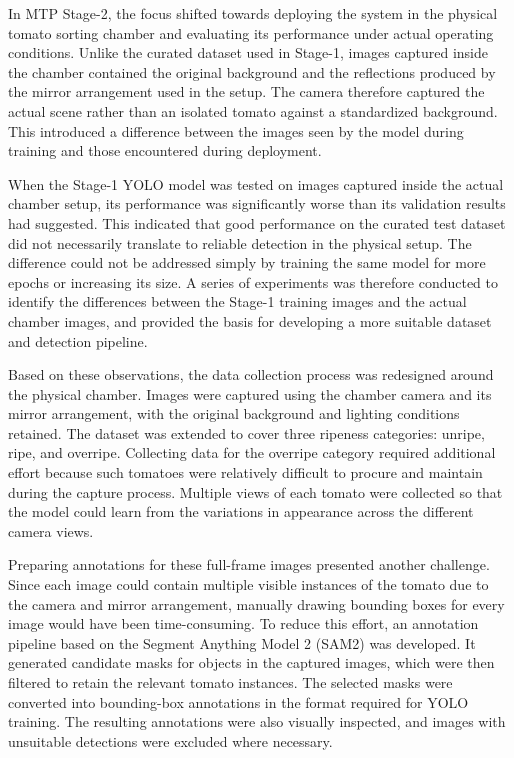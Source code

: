 \documentclass[12pt,a4paper]{report}
\begin{document}
In MTP Stage-2, the focus shifted towards deploying the system in the physical tomato sorting chamber and evaluating its performance under actual operating conditions. Unlike the curated dataset used in Stage-1, images captured inside the chamber contained the original background and the reflections produced by the mirror arrangement used in the setup. The camera therefore captured the actual scene rather than an isolated tomato against a standardized background. This introduced a difference between the images seen by the model during training and those encountered during deployment.

When the Stage-1 YOLO model was tested on images captured inside the actual chamber setup, its performance was significantly worse than its validation results had suggested. This indicated that good performance on the curated test dataset did not necessarily translate to reliable detection in the physical setup. The difference could not be addressed simply by training the same model for more epochs or increasing its size. A series of experiments was therefore conducted to identify the differences between the Stage-1 training images and the actual chamber images, and provided the basis for developing a more suitable dataset and detection pipeline.

Based on these observations, the data collection process was redesigned around the physical chamber. Images were captured using the chamber camera and its mirror arrangement, with the original background and lighting conditions retained. The dataset was extended to cover three ripeness categories: unripe, ripe, and overripe. Collecting data for the overripe category required additional effort because such tomatoes were relatively difficult to procure and maintain during the capture process. Multiple views of each tomato were collected so that the model could learn from the variations in appearance across the different camera views.

Preparing annotations for these full-frame images presented another challenge. Since each image could contain multiple visible instances of the tomato due to the camera and mirror arrangement, manually drawing bounding boxes for every image would have been time-consuming. To reduce this effort, an annotation pipeline based on the Segment Anything Model 2 (SAM2) was developed. It generated candidate masks for objects in the captured images, which were then filtered to retain the relevant tomato instances. The selected masks were converted into bounding-box annotations in the format required for YOLO training. The resulting annotations were also visually inspected, and images with unsuitable detections were excluded where necessary.
\end{document}

